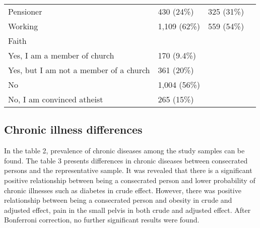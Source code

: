 \documentclass[ijerph,article,accept,moreauthors,pdftex]{mdpi}
\begin{document}
\begin{table}
{\begin{tabular}[t]{llll}
\hspace{1em}Pensioner & 430 (24\%) & 325 (31\%) & \\
\hspace{1em}Working & 1,109 (62\%) & 559 (54\%) & \\
Faith &  &  & \\
\hspace{1em}Yes, I am a member of church & 170 (9.4\%) &  & \\
\addlinespace
\hspace{1em}Yes, but I am not a member of a church & 361 (20\%) &  & \\
\hspace{1em}No & 1,004 (56\%) &  & \\
\hspace{1em}No, I am convinced atheist & 265 (15\%) &  & \\
\bottomrule
\end{tabular}}
\end{table}

\newpage

\hypertarget{chronic-illness-differences}{%
\subsection{Chronic illness
differences}\label{chronic-illness-differences}}

In the table 2, prevalence of chronic diseases among the study samples
can be found. The table 3 presents differences in chronic diseases
between consecrated persons and the representative sample. It was
revealed that there is a significant positive relationship between being
a consecrated person and lower probability of chronic illnesses such as
diabetes in crude effect. However, there was positive relationship
between being a consecrated person and obesity in crude and adjusted
effect, pain in the small pelvis in both crude and adjusted effect.
After Bonferroni correction, no further significant results were found.
\end{document}
